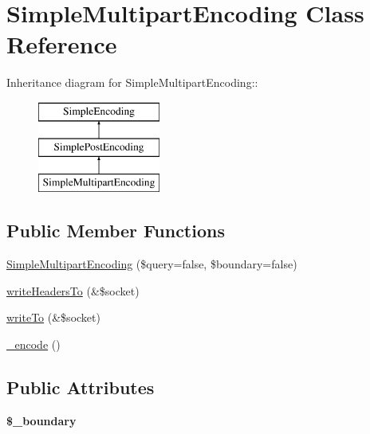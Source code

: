 \hypertarget{class_simple_multipart_encoding}{
\section{SimpleMultipartEncoding Class Reference}
\label{class_simple_multipart_encoding}
}
Inheritance diagram for SimpleMultipartEncoding::\begin{figure}[H]
\begin{center}
\leavevmode
\includegraphics[height=3cm]{class_simple_multipart_encoding}
\end{center}
\end{figure}
\subsection*{Public Member Functions}
\begin{DoxyCompactItemize}
\item 
\hyperlink{class_simple_multipart_encoding_ad7311975ea717cd2ce3eb44db7a2ec90}{SimpleMultipartEncoding} (\$query=false, \$boundary=false)
\item 
\hyperlink{class_simple_multipart_encoding_a6b5cef09d6de499b8eec15bf81ac70fc}{writeHeadersTo} (\&\$socket)
\item 
\hyperlink{class_simple_multipart_encoding_acaedbfc33a85c6db3ea616491b00442b}{writeTo} (\&\$socket)
\item 
\hyperlink{class_simple_multipart_encoding_abaf98447496b4c38e470684da14e9ef5}{\_\-encode} ()
\end{DoxyCompactItemize}
\subsection*{Public Attributes}
\begin{DoxyCompactItemize}
\item 
\hypertarget{class_simple_multipart_encoding_a51bda7622c19093db4c52d87e428eb18}{
{\bfseries \$\_\-boundary}}
\label{class_simple_multipart_encoding_a51bda7622c19093db4c52d87e428eb18}

\end{DoxyCompactItemize}



